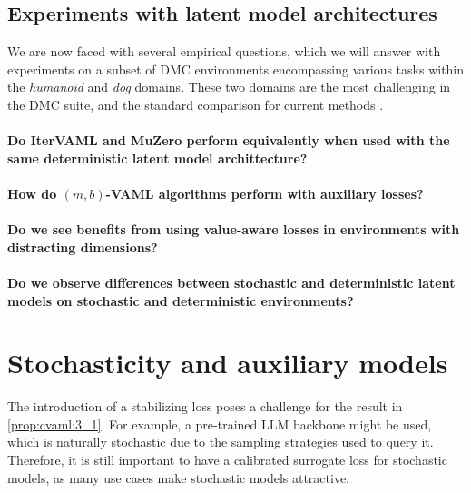 \subsection{Experiments with latent model architectures}
\label{sec:cvaml:latent_experiments}

We are now faced with several empirical questions, which we will answer with experiments on a subset of DMC environments \cite{tunyasuvunakool2020dmcontrol} encompassing various tasks within the \textit{humanoid} and \textit{dog} domains.
These two domains are the most challenging in the DMC suite, and the standard comparison for current methods \cite{voelcker2025mad,nauman2024bigger}.

\paragraph{Do IterVAML and MuZero perform equivalently when used with the same deterministic latent model archittecture?}

\paragraph{How do $(m,b)$-VAML algorithms perform with auxiliary losses?}

\paragraph{Do we see benefits from using value-aware losses in environments with distracting dimensions?}

\paragraph{Do we observe differences between stochastic and deterministic latent models on stochastic and deterministic environments?}

\section{Stochasticity and auxiliary models}
\label{sec:cvaml:theory_2}

The introduction of a stabilizing loss poses a challenge for the result in \autoref{prop:cvaml:3_1}.
For example, a pre-trained LLM backbone might be used, which is naturally stochastic due to the sampling strategies used to query it.
Therefore, it is still important to have a calibrated surrogate loss for stochastic models, as many use cases make stochastic models attractive.

